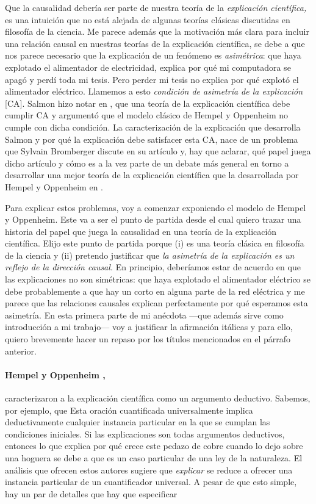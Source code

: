 Que la causalidad debería ser parte de nuestra teoría de la \emph
{explicación científica,} es una intuición que no está alejada de
algunas teorías clásicas discutidas en filosofía de la ciencia. Me parece
además que la motivación más clara para incluir una relación causal en
nuestras teorías de la explicación científica, se debe a que nos parece
necesario que la explicación de un fenómeno es \emph{asimétrica}: que
haya explotado el alimentador de electricidad, explica por qué mi
computadora se apagó y perdí toda mi tesis. Pero perder mi tesis no
explica por qué explotó el alimentador eléctrico. Llamemos a esto \emph
{condición de asimetría de la explicación} [CA]. Salmon hizo notar en
, que una teoría de la explicación científica debe
cumplir CA  y argumentó que el modelo clásico de
Hempel y Oppenheim no cumple con dicha condición. La caracterización de la
explicación que desarrolla Salmon y por qué la explicación debe satisfacer
esta CA, nace de un problema que Sylvain Bromberger discute en su
artículo  y, hay que aclarar, qué papel
juega dicho artículo y cómo es a la vez parte de un debate más general en
torno a desarrollar una mejor teoría de la explicación científica que la
desarrollada por Hempel y Oppenheim en .

Para explicar estos problemas, voy a comenzar exponiendo el modelo de
Hempel y Oppenheim. Este va a ser el punto de partida desde el cual quiero
trazar una historia del papel que juega la causalidad en una teoría de la
explicación científica. Elijo este punto de partida porque (i) es una
teoría clásica en filosofía de la ciencia y (ii) pretendo justificar que
\emph{la asimetría de la explicación es un reflejo de la dirección causal.
} En principio, deberíamos estar de acuerdo en que las explicaciones no
son simétricas: que haya explotado el alimentador eléctrico se debe
probablemente a que hay un corto en alguna parte de la red eléctrica y me
parece que las relaciones causales explican perfectamente por qué
esperamos esta asimetría. En esta primera parte de mi anécdota ---que
además sirve como introducción a mi trabajo--- voy a justificar la
afirmación itálicas y para ello, quiero brevemente hacer un repaso por los
títulos mencionados en el párrafo anterior.

\paragraph{Hempel y Oppenheim \parencite{Hempel1948},} caracterizaron
a la explicación científica como un argumento deductivo.
Sabemos, por ejemplo, que  Esta oración cuantificada universalmente implica deductivamente
cualquier instancia particular en la que se cumplan las condiciones
iniciales. Si las explicaciones son todas argumentos deductivos, entonces
lo que explica por qué crece este pedazo de cobre cuando lo dejo sobre una
hoguera se debe a que es un caso particular de una ley de la naturaleza.
El análisis que ofrecen estos autores sugiere que \emph{explicar} se
reduce a ofrecer una instancia particular de un cuantificador universal. A
pesar de que esto simple, hay un par de detalles que hay que especificar

